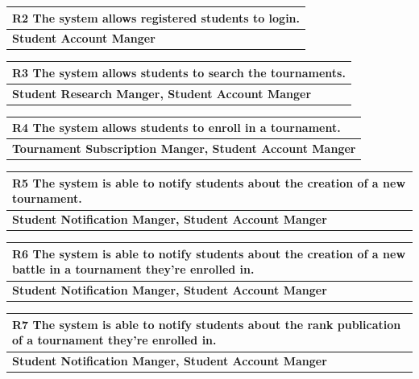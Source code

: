 \documentclass[12pt, a4paper]{report}
\begin{document}
\begin{table}[H]
    \begin{tabularx}{\textwidth}{X}
    \textbf{R2} The system allows registered students to login.\\
    \hline 
    \textbf{Student Account Manger}
\end{tabularx}
\end{table}

\begin{table}[H]
    \begin{tabularx}{\textwidth}{X}
    \textbf{R3} The system allows students to search the tournaments.\\
    \hline 
    \textbf{Student Research Manger, Student Account Manger}
    \end{tabularx}
\end{table}

\begin{table}[H]
    \begin{tabularx}{\textwidth}{X}
    \textbf{R4} The system allows students to enroll in a tournament.\\
    \hline 
    \textbf{Tournament Subscription Manger, Student Account Manger}
    \end{tabularx}
\end{table}

\begin{table}[H]
    \begin{tabularx}{\textwidth}{X}
    \textbf{R5} The system is able to notify students about the creation of a new tournament.\\
    \hline 
    \textbf{Student Notification Manger, Student Account Manger}
    \end{tabularx}
\end{table}

\begin{table}[H]
    \begin{tabularx}{\textwidth}{X}
    \textbf{R6} The system is able to notify students about the creation of a new battle in a tournament they're enrolled in.\\
    \hline 
    \textbf{Student Notification Manger, Student Account Manger}
    \end{tabularx}
\end{table}

\begin{table}[H]
    \begin{tabularx}{\textwidth}{X}
    \textbf{R7} The system is able to notify students about the rank publication of a tournament they're enrolled in.\\
    \hline 
    \textbf{Student Notification Manger, Student Account Manger}
    \end{tabularx}
\end{table}
\end{document}
